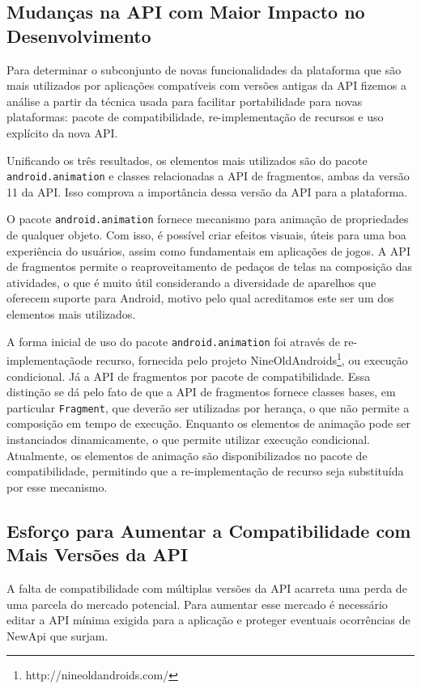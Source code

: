 \subsection{Mudanças na API com Maior Impacto no Desenvolvimento} \label{subsec:mudancas}

Para determinar o subconjunto de novas funcionalidades da plataforma que são mais
utilizados por aplicações compatíveis com versões antigas da API fizemos a análise
a partir da técnica usada para facilitar portabilidade para novas plataformas: pacote
de compatibilidade, re-implementação de recursos e uso explícito da nova API.

Unificando os três resultados,  os elementos mais utilizados são do pacote
\texttt{android.animation} e classes relacionadas a API de fragmentos, ambas
da versão 11 da API. Isso comprova a importância dessa versão da API para a
plataforma. 

O pacote \texttt{android.animation} fornece mecanismo para animação de propriedades
de qualquer objeto. Com isso, é possível criar efeitos visuais, úteis para uma boa
experiência do usuários, assim como fundamentais em aplicações de jogos. A API de
fragmentos permite o reaproveitamento de pedaços de telas na composição das atividades,
o que é muito útil considerando a diversidade de aparelhos que oferecem suporte para
Android, motivo pelo qual acreditamos este ser um dos elementos mais utilizados. 

A forma inicial de uso do pacote \texttt{android.animation} foi através de
re-implementaçãode recurso, fornecida pelo projeto NineOldAndroids\footnote{http://nineoldandroids.com/},
ou execução condicional. Já a API de fragmentos por pacote de compatibilidade.
Essa distinção se dá pelo fato de que a API de fragmentos fornece classes bases,
em particular \texttt{Fragment}, que deverão ser utilizadas por herança, o que não
permite a composição em tempo de execução. Enquanto os elementos de animação pode
ser instanciados dinamicamente, o que permite utilizar execução condicional.
Atualmente, os elementos de animação são disponibilizados no pacote de compatibilidade,
permitindo que a re-implementação de recurso seja substituída por esse mecanismo.

\subsection{Esforço para Aumentar a Compatibilidade com Mais Versões da API} \label{subsec:esforco}

A falta de compatibilidade com múltiplas versões da API acarreta uma perda de uma
parcela do mercado potencial. Para aumentar esse mercado é necessário editar a API
mínima exigida para a aplicação e proteger eventuais ocorrências de NewApi que surjam.

